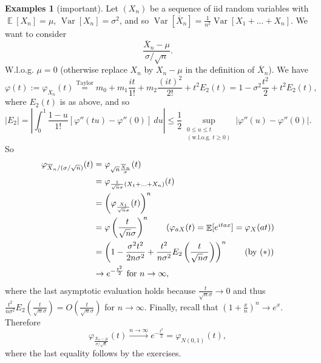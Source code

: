 \documentclass[12pt,a4paper]{report}
\theoremstyle{definition}
\newtheorem*{examples}{Examples}
\theoremstyle{num.custom-title}
\DeclareMathOperator{\E}{\mathbb{E}}
\DeclareMathOperator{\Var}{Var}
\newcommand{\ol}{\overline}
\renewcommand{\phi}{\varphi}
\renewcommand{\1}{\mathbbm{1}}
\begin{document}
\begin{examples}[important]
Let $(X_n)$ be a sequence of iid random variables with $\E[X_n] = \mu$, $\Var[X_n] = \sigma^2$, and so $\Var[\ol{X}_n] = \frac{1}{n^2} \Var[X_1+...+X_n]$. We want to consider
\[
\frac{\ol{X}_n - \mu}{\sigma/\sqrt{n}}.
\]
W.l.o.g. $\mu=0$ (otherwise replace $X_n$ by $X_n - \mu$ in the definition of $\ol{X}_n$). We have
\[
\phi(t) := \phi_{X_n}(t) \stackrel{\text{Taylor}}{=} m_0 + m_1 \frac{it}{1!} + m_2 \frac{(it)^2}{2!} + t^2 E_2(t) = 1 - \sigma^2 \frac{t^2}{2} + t^2 E_2(t), \tag{$*$}
\]
where $E_2(t)$ is as above, and so
\[
|E_2| = \left| \int_0^1 \frac{1-u}{1!} [\phi''(tu) - \phi''(0)] \ du \right| \leq \frac{1}{2} \sup_{\substack{0 \leq u \leq t \\ (\text{w.l.o.g. } t \geq 0)}} |\phi''(u) - \phi''(0)|.
\]
So
\begin{align*}
\phi_{\ol{X}_n/(\sigma/\sqrt{n})}(t)
&= \phi_{\sqrt{n} \frac{\ol{X}_n}{\sigma}}(t) \\
&= \phi_{\frac{1}{\sqrt{n} \sigma} (X_1 + \ldots + X_n)}(t) \\
&= \left( \phi_{\frac{X_1}{\sqrt{n} \sigma}}(t) \right)^n \\
&= \phi \left( \frac{t}{\sqrt{n} \sigma} \right)^n \tag{$\phi_{aX}(t) = \E[e^{itax}] = \phi_X(at)$} \\
&= \left( 1 - \frac{\sigma^2 t^2}{2n\sigma^2} + \frac{t^2}{n\sigma^2} E_2 \left( \frac{t}{\sqrt{n} \sigma} \right) \right)^n \tag{by $(*)$} \\
&\to e^{-\frac{t^2}{2}} \text{ for } n \to \infty,
\end{align*}
where the last asymptotic evaluation holds because $\frac{t}{\sqrt{n} \sigma} \to 0$ and thus $\frac{t^2}{n\sigma^2} E_2 \left( \frac{t}{\sqrt{n} \sigma} \right) = O(\frac{t}{\sqrt{n} \sigma})$ for $n \to \infty$. Finally, recall that $(1+\frac{x}{n})^n \to e^x$. Therefore
\[
\phi_{\frac{\ol{X}_n - \mu}{\sigma/\sqrt{n}}}(t) \stackrel{n \to \infty}{\longrightarrow} e^{-\frac{t^2}{2}} = \phi_{N(0,1)}(t),
\]
where the last equality follows by the exercises.
\end{examples}
\end{document}
